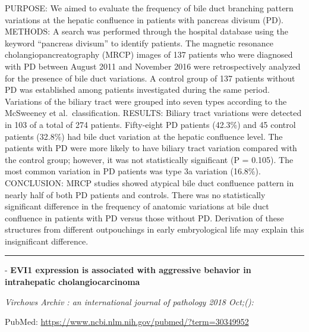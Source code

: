 \documentclass[]{article}
\begin{document}
PURPOSE: We aimed to evaluate the frequency of bile duct branching
pattern variations at the hepatic confluence in patients with pancreas
divisum (PD). METHODS: A search was performed through the hospital
database using the keyword ``pancreas divisum'' to identify patients.
The magnetic resonance cholangiopancreatography (MRCP) images of 137
patients who were diagnosed with PD between August 2011 and November
2016 were retrospectively analyzed for the presence of bile duct
variations. A control group of 137 patients without PD was established
among patients investigated during the same period. Variations of the
biliary tract were grouped into seven types according to the McSweeney
et al.~classification. RESULTS: Biliary tract variations were detected
in 103 of a total of 274 patients. Fifty-eight PD patients (42.3\%) and
45 control patients (32.8\%) had bile duct variation at the hepatic
confluence level. The patients with PD were more likely to have biliary
tract variation compared with the control group; however, it was not
statistically significant (P = 0.105). The most common variation in PD
patients was type 3a variation (16.8\%). CONCLUSION: MRCP studies showed
atypical bile duct confluence pattern in nearly half of both PD patients
and controls. There was no statistically significant difference in the
frequency of anatomic variations at bile duct confluence in patients
with PD versus those without PD. Derivation of these structures from
different outpouchings in early embryological life may explain this
insignificant difference.

{}

{}

\begin{center}\rule{0.5\linewidth}{\linethickness}\end{center}

 - \textbf{EVI1 expression is associated with aggressive behavior in
intrahepatic cholangiocarcinoma}

\emph{Virchows Archiv : an international journal of pathology 2018
Oct;():}

PubMed: \url{https://www.ncbi.nlm.nih.gov/pubmed/?term=30349952}
\end{document}

